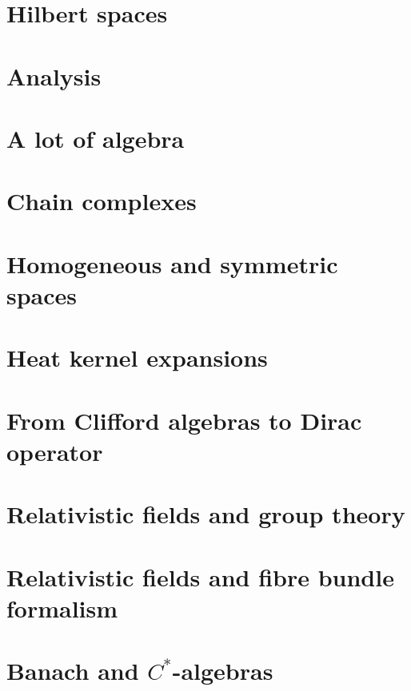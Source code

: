 \chapter{Hilbert spaces}



\chapter{Analysis}









\chapter{A lot of algebra}




\chapter{Chain complexes}


\chapter{Homogeneous and symmetric spaces}




\chapter{Heat kernel expansions}


\chapter{From Clifford algebras to Dirac operator}



\chapter{Relativistic fields and group theory}


\chapter{Relativistic fields and fibre bundle formalism}


\chapter{Banach and \texorpdfstring{$C^*$}{C*}-algebras}
   
   
   

